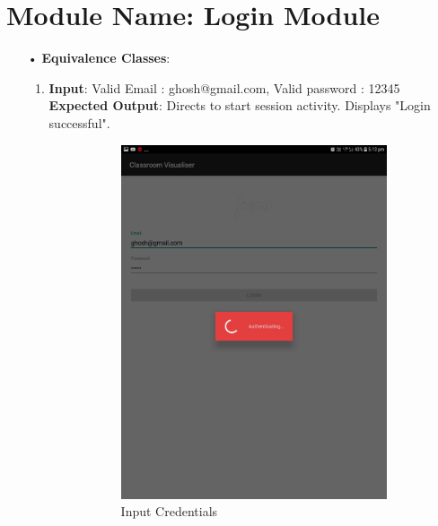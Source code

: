 \documentclass{scrreprt}
\begin{document}
\section{Module Name: Login Module}
\begin{itemize}
\item[•]\textbf{Equivalence Classes}:
\begin{enumerate}
\item \textbf{Input}: Valid Email : ghosh@gmail.com, Valid password : 12345\\
\textbf{Expected Output}: Directs to start session activity. Displays "Login successful".

\begin{figure}[H]
\begin{subfigure}{0.5\textwidth}
\includegraphics[width=0.85\linewidth, keepaspectratio]{logincredentials.jpg} 
\caption{Input Credentials}
\label{fig:subim1}
\end{subfigure}
\begin{subfigure}{0.5\textwidth}

\end{subfigure}
\end{figure}
\end{enumerate}
\end{itemize}
\end{document}
